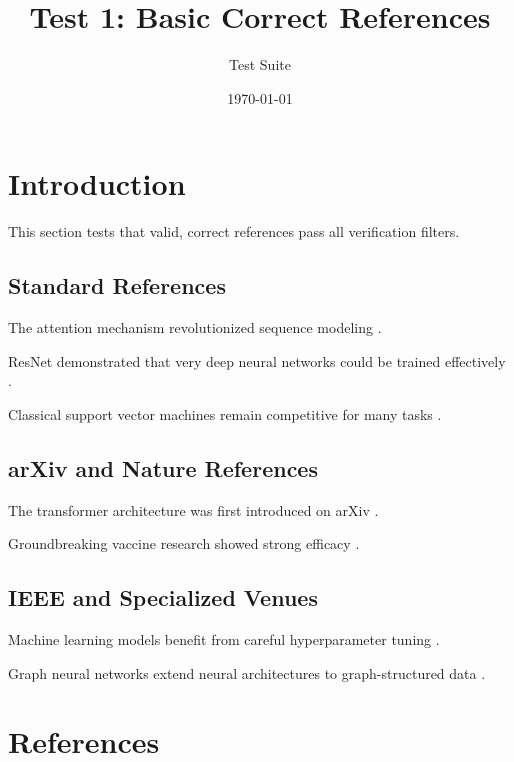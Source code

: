 \documentclass{article}
\title{Test 1: Basic Correct References}
\author{Test Suite}
\date{\today}
\begin{document}
\section{Introduction}

This section tests that valid, correct references pass all verification filters.

\subsection{Standard References}

The attention mechanism revolutionized sequence modeling \cite{Vaswani2017}.

ResNet demonstrated that very deep neural networks could be trained effectively \cite{He2015}.

Classical support vector machines remain competitive for many tasks \cite{Cortes1995}.

\subsection{arXiv and Nature References}

The transformer architecture was first introduced on arXiv \cite{Attention2017}.

Groundbreaking vaccine research showed strong efficacy \cite{Polack2020}.

\subsection{IEEE and Specialized Venues}

Machine learning models benefit from careful hyperparameter tuning \cite{Bergstra2012}.

Graph neural networks extend neural architectures to graph-structured data \cite{Hamilton2017}.

\section{References}
\end{document}

